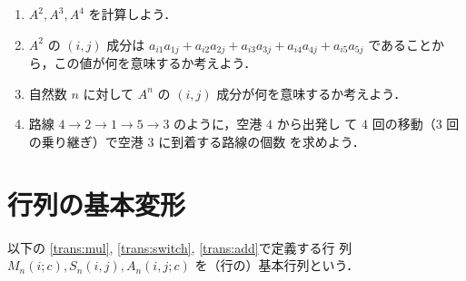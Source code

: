 \documentclass[11pt, uplatex, dvipdfmx]{jsarticle}
\begin{document}
\begin{enumerate}[label=\ref{sec:matrix}.\arabic*]
\begin{enumerate}[label=(\arabic*)]
  \item $A^2, A^3, A^4$ を計算しよう．

  \item $A^2$ の $(i,j)$ 成分は
    $a_{i1} a_{1j} + a_{i2}a_{2j} + a_{i3}a_{3j} + a_{i4}a_{4j} +
    a_{i5}a_{5j}$ であることから，この値が何を意味するか考えよう．

  \item 自然数 $n$ に対して $A^n$ の $(i,j)$ 成分が何を意味するか考えよう．

  \item 路線 $4 \to 2 \to 1 \to 5 \to 3$ のように，空港 $4$ から出発し
    て $4$ 回の移動（$3$ 回の乗り継ぎ）で空港 $3$ に到着する路線の個数
    を求めよう．
  \end{enumerate}


\end{enumerate}

\section{行列の基本変形}\label{sec:transform}

以下の \ref{trans:mul}, \ref{trans:switch}, \ref{trans:add}で定義する行
列 $M_n(i;c), S_n(i,j), A_n(i,j;c)$ を（行の）基本行列という．
\end{document}
